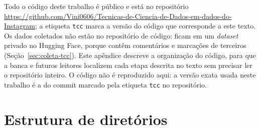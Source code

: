 Todo o código deste trabalho é público e está no repositório \url{https://github.com/Vini0606/Tecnicas-de-Ciencia-de-Dados-em-dados-do-Instagram}; a etiqueta \texttt{tcc} marca a versão do código que corresponde a este texto. Os dados coletados não estão no repositório de código: ficam em um \emph{dataset} privado no Hugging Face, porque contêm comentários e marcações de terceiros (Seção~\ref{sec:coleta-tcc}). Este apêndice descreve a organização do código, para que a banca e futuros leitores localizem cada etapa descrita no texto sem precisar ler o repositório inteiro. O código não é reproduzido aqui: a versão exata usada neste trabalho é a do commit marcado pela etiqueta \texttt{tcc} no repositório.

\section*{Estrutura de diretórios}


